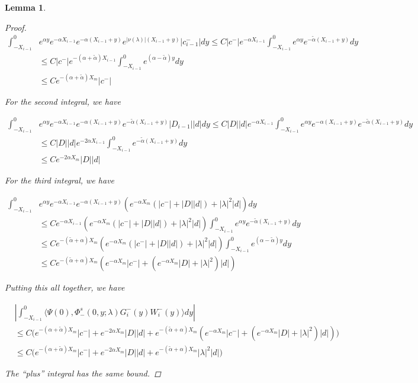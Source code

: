 \documentclass[12pt]{article}
\newtheorem{lemma}{Lemma}
\begin{document}
\begin{lemma}
\begin{proof}
\begin{align*}
\int_{-X_{i-1}}^0 &e^{\alpha y} e^{-\alpha X_{i-1}} e^{-\alpha(X_{i-1} + y)} e^{|\nu(\lambda)|(X_{i-1} + y)} |c_{i-1}^-| dy \leq C |c^-| e^{-\alpha X_{i-1}} \int_{-X_{i-1}}^0 e^{\alpha y} e^{-\tilde{\alpha}(X_{i-1} + y)} dy \\
&\leq C |c^-| e^{-(\alpha + \tilde{\alpha}) X_{i-1}} \int_{-X_{i-1}}^0 e^{(\alpha - \tilde{\alpha}) y} dy \\
&\leq C e^{-(\alpha + \tilde{\alpha}) X_m} |c^-|
\end{align*}

For the second integral, we have

\begin{align*}
\int_{-X_{i-1}}^0 &e^{\alpha y} e^{-\alpha X_{i-1}} e^{-\alpha(X_{i-1} + y)} e^{-\tilde{\alpha}(X_{i-1} + y)}|D_{i-1}||d|  dy \leq C |D||d| e^{-\alpha X_{i-1}} \int_{-X_{i-1}}^0 e^{\alpha y} e^{-\alpha(X_{i-1} + y)} e^{-\tilde{\alpha}(X_{i-1} + y)} dy \\
&\leq C |D||d| e^{-2 \alpha X_{i-1}} \int_{-X_{i-1}}^0 e^{-\tilde{\alpha}(X_{i-1} + y)} dy \\
&\leq C  e^{-2 \alpha X_m} |D||d|
\end{align*}

For the third integral, we have

\begin{align*}
\int_{-X_{i-1}}^0 &e^{\alpha y} e^{-\alpha X_{i-1}} e^{-\alpha(X_{i-1} + y)}( e^{-\alpha X_m}( |c^-| + |D||d|) + |\lambda|^2 |d| ) dy \\
&\leq C e^{-\alpha X_{i-1}} ( e^{-\alpha X_m}( |c^-| + |D||d|) + |\lambda|^2 |d| ) \int_{-X_{i-1}}^0 e^{\alpha y}  e^{-\tilde{\alpha}(X_{i-1} + y)} dy \\
&\leq C e^{-(\tilde{\alpha} + \alpha) X_m} ( e^{-\alpha X_m}( |c^-| + |D||d|) + |\lambda|^2 |d| ) \int_{-X_{i-1}}^0 e^{(\alpha - \tilde{\alpha}) y} dy \\
&\leq C e^{-(\tilde{\alpha} + \alpha) X_m} ( e^{-\alpha X_m} |c^-| + (e^{-\alpha X_m}|D| + |\lambda|^2) |d| )
\end{align*}

Putting this all together, we have

\begin{align*}
&\left| \int_{-X_{i-1}}^0 \langle \Psi(0), \Phi^s_-(0, y; \lambda) G_i^-(y) W_i^-(y) \rangle dy \right| \\
&\leq C \Big( e^{-(\alpha + \tilde{\alpha}) X_m} |c^-| + e^{-2 \alpha X_m} |D||d| + e^{-(\tilde{\alpha} + \alpha) X_m} ( e^{-\alpha X_m} |c^-| + (e^{-\alpha X_m}|D| + |\lambda|^2) |d| ) \Big) \\
&\leq C \Big( e^{-(\alpha + \tilde{\alpha}) X_m} |c^-| + e^{-2 \alpha X_m} |D||d| + e^{-(\tilde{\alpha} + \alpha) X_m} |\lambda|^2 |d| \Big)
\end{align*}

The ``plus'' integral has the same bound.

\end{proof}
\end{lemma}
\end{document}
